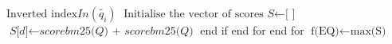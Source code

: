 \begin{algorithmic}[1]
\State $\text{Inverted index} In(\tilde{q_i})$
\State $\text{Initialise the vector of scores }\textit{S} \gets \text{[ ]}$
    \State $\textit{S[d]} \gets \textit{scorebm25(Q) + scorebm25(\~{Q})}$
    \EndIf end if
\EndFor end for
\EndFor end for
\State $\text{f(EQ)} \gets \text{max(S)}$
\EndProcedure
\end{algorithmic}